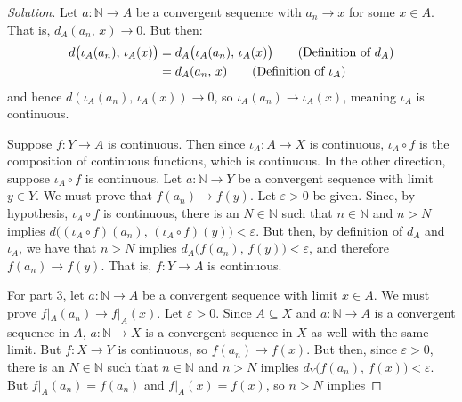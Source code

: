 \documentclass{article}
\theoremstyle{normal}
\begin{document}
    \begin{proof}[Solution]
        Let $a:\mathbb{N}\rightarrow{A}$ be a convergent sequence with
        $a_{n}\rightarrow{x}$ for some $x\in{A}$. That is,
        $d_{A}(a_{n},\,x)\rightarrow{0}$. But then:
        \begin{align}
            d\big(\iota_{A}(a_{n}),\,\iota_{A}(x)\big)
            &=d_{A}\big(\iota_{A}(a_{n}),\,\iota_{A}(x)\big)
                \tag{Definition of $d_{A}$}\\
            &=d_{A}(a_{n},\,x)\tag{Definition of $\iota_{A}$}
        \end{align}
        and hence $d(\iota_{A}(a_{n}),\,\iota_{A}(x))\rightarrow{0}$, so
        $\iota_{A}(a_{n})\rightarrow\iota_{A}(x)$,
        meaning $\iota_{A}$ is continuous.
        \par\hfill\par
        Suppose $f:Y\rightarrow{A}$ is continuous. Then since
        $\iota_{A}:A\rightarrow{X}$ is continuous,
        $\iota_{A}\circ{f}$ is the composition of continuous functions, which
        is continuous. In the other direction, suppose
        $\iota_{A}\circ{f}$ is continuous. Let $a:\mathbb{N}\rightarrow{Y}$ be
        a convergent sequence with limit $y\in{Y}$. We must prove that
        $f(a_{n})\rightarrow{f}(y)$. Let $\varepsilon>0$ be given. Since, by
        hypothesis, $\iota_{A}\circ{f}$ is continuous, there is an
        $N\in\mathbb{N}$ such that $n\in\mathbb{N}$ and $n>N$ implies
        $d\big((\iota_{A}\circ{f})(a_{n}),\,(\iota_{A}\circ{f})(y)\big)<\varepsilon$.
        But then, by definition of $d_{A}$ and $\iota_{A}$, we have that $n>N$
        implies $d_{A}\big(f(a_{n}),\,f(y)\big)<\varepsilon$, and therefore
        $f(a_{n})\rightarrow{f}(y)$. That is, $f:Y\rightarrow{A}$ is continuous.
        \par\hfill\par
        For part 3, let $a:\mathbb{N}\rightarrow{A}$ be a convergent sequence
        with limit $x\in{A}$. We must prove
        $f|_{A}(a_{n})\rightarrow{f}|_{A}(x)$. Let $\varepsilon>0$. Since
        $A\subseteq{X}$ and $a:\mathbb{N}\rightarrow{A}$ is a convergent
        sequence in $A$, $a:\mathbb{N}\rightarrow{X}$ is a convergent sequence
        in $X$ as well with the same limit. But $f:X\rightarrow{Y}$ is
        continuous, so $f(a_{n})\rightarrow{f}(x)$. But then, since
        $\varepsilon>0$, there is an $N\in\mathbb{N}$ such that $n\in\mathbb{N}$
        and $n>N$ implies $d_{Y}\big(f(a_{n}),\,f(x)\big)<\varepsilon$. But
        $f|_{A}(a_{n})=f(a_{n})$ and $f|_{A}(x)=f(x)$, so $n>N$ implies

\end{proof}
\end{document}

